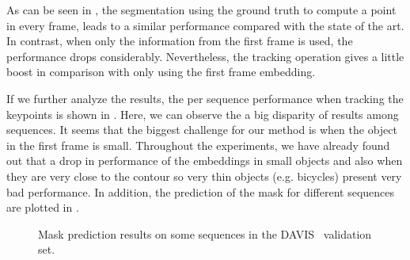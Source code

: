 As can be seen in , the segmentation using the ground truth to compute a point in every frame, leads to a similar performance compared with the state of the art.
In contrast, when only the information from the first frame is used, the performance drops considerably.
Nevertheless, the tracking operation gives a little boost in comparison with only using the first frame embedding.

If we further analyze the results, the per sequence performance when tracking the keypoints is shown in .
Here, we can observe the a big disparity of results among sequences.
It seems that the biggest challenge for our method is when the object in the first frame is small.
Throughout the experiments, we have already found out that a drop in performance of the embeddings in small objects and also when they are very close to the contour so very thin objects (e.g. bicycles) present very bad performance.
In addition, the prediction of the mask for different sequences are plotted in .

\begin{figure}[ht]
  \centering
  \caption{Mask prediction results on some sequences in the DAVIS~ validation set. }
  \label{fig:pred_masks_davis}
\end{figure}

